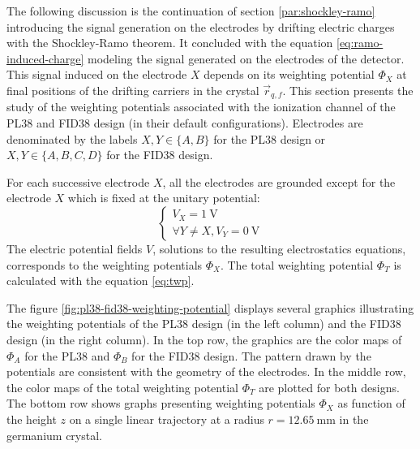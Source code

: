 The following discussion is the continuation of section \ref{par:shockley-ramo} introducing the signal generation on the electrodes by drifting electric charges with the Shockley-Ramo theorem. It concluded with the equation \ref{eq:ramo-induced-charge} modeling the signal generated on the electrodes of the detector. This signal induced on the electrode $X$ depends on its weighting potential $\Phi_X$ at final positions of the drifting carriers in the crystal $\vec{r}_{q, f}$. This section presents the study of the weighting potentials associated with the ionization channel of the PL38 and FID38 design (in their default configurations). Electrodes are denominated by the labels $X,Y \in \{ A, B \}$ for the PL38 design or $X,Y \in \{ A, B, C, D \}$ for the FID38 design.

For each successive electrode $X$, all the electrodes are grounded except for the electrode $X$ which is fixed at the unitary potential:
\begin{equation}
\begin{cases}
V_X = \SI{1}{\volt} \\
\forall Y \neq X, V_Y = \SI{0}{\volt}
\end{cases}
\end{equation}
The electric potential fields $V$, solutions to the resulting electrostatics equations, corresponds to the weighting potentials $\Phi_X$. The total weighting potential $\Phi_T$ is calculated with the equation \ref{eq:twp}.
 
The figure \ref{fig:pl38-fid38-weighting-potential} displays several graphics illustrating the weighting potentials of the PL38 design (in the left column) and the FID38 design (in the right column).
In the top row, the graphics are the color maps of $\Phi_A$ for the PL38 and $\Phi_B$ for the FID38 design. The pattern drawn by the potentials are consistent with the geometry of the electrodes. 
 In the middle row, the color maps of the total weighting potential $\Phi_T$ are plotted for both designs. The bottom row shows graphs presenting weighting potentials $\Phi_X$ as function of the height $z$ on a single linear trajectory at a radius $r=\SI{12.65}{\mm}$ in the germanium crystal.


